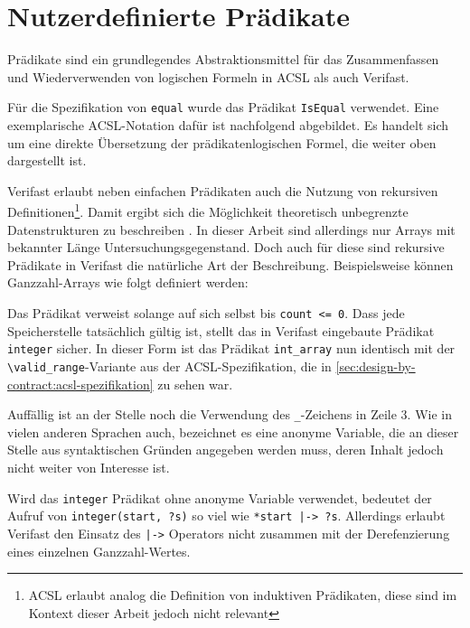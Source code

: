\section{Nutzerdefinierte Prädikate}
\label{sec:design-by-contract:predicates}

Prädikate sind ein grundlegendes Abstraktionsmittel für das Zusammenfassen und Wiederverwenden von logischen 
Formeln in ACSL als auch Verifast.

Für die Spezifikation von \texttt{equal} wurde das Prädikat \lstinline{IsEqual} verwendet. Eine
exemplarische ACSL-Notation dafür ist nachfolgend abgebildet. Es handelt sich um eine direkte
Übersetzung der prädikatenlogischen Formel, die weiter oben dargestellt ist.



Verifast erlaubt neben einfachen Prädikaten auch die Nutzung von rekursiven Definitionen\footnote{ACSL erlaubt
analog die Definition von induktiven Prädikaten, diese sind im Kontext dieser Arbeit jedoch nicht relevant}. 
Damit ergibt sich die Möglichkeit theoretisch unbegrenzte Datenstrukturen zu beschreiben \cite[S. 9]{jacobs-tutorial}. In dieser
Arbeit sind allerdings nur Arrays mit bekannter Länge Untersuchungsgegenstand. Doch auch für diese sind
rekursive Prädikate in Verifast die natürliche Art der Beschreibung. Beispielsweise können Ganzzahl-Arrays
wie folgt definiert werden:



Das Prädikat verweist solange auf sich selbst bis \lstinline{count <= 0}. Dass jede Speicherstelle tatsächlich
gültig ist, stellt das in Verifast eingebaute Prädikat \lstinline{integer} sicher. In dieser Form ist das Prädikat
\lstinline{int_array} nun identisch mit der \lstinline{\valid_range}-Variante aus der ACSL-Spezifikation, 
die in \ref{sec:design-by-contract:acsl-spezifikation} zu sehen war.

Auffällig ist an der Stelle noch die Verwendung des \lstinline{_}-Zeichens in Zeile 3. Wie in vielen anderen 
Sprachen auch, bezeichnet es eine anonyme Variable, die an dieser Stelle aus syntaktischen Gründen angegeben werden
muss, deren Inhalt jedoch nicht weiter von Interesse ist. 

Wird das \lstinline{integer} Prädikat ohne anonyme Variable verwendet, bedeutet der Aufruf von 
\lstinline{integer(start, ?s)} so viel wie \lstinline{*start |-> ?s}. Allerdings erlaubt Verifast
den Einsatz des \lstinline{|->} Operators nicht zusammen mit der Derefenzierung eines einzelnen
Ganzzahl-Wertes.

